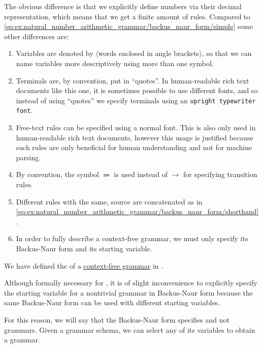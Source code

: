 \begin{example}
  The obvious difference is that we explicitly define numbers via their decimal representation, which means that we get a finite amount of rules. Compared to \eqref{eq:ex:natural_number_arithmetic_grammar/backus_naur_form/simple} some other differences are:
  \begin{enumerate}
    \item Variables are denoted by \( \langle \)words enclosed in angle brackets\( \rangle \), so that we can name variables more descriptively using more than one symbol.
    \item Terminals are, by convention, put in \enquote{quotes}. In human-readable rich text documents like this one, it is sometimes possible to use different fonts, and so instead of using \enquote{quotes} we specify terminals using an \texttt{upright typewriter font}.
    \item Free-text rules can be specified using a normal font. This is also only used in human-readable rich text documents, however this usage is justified because such rules are only beneficial for human understanding and not for machine parsing.
    \item By convention, the symbol \( \Coloneqq \) is used instead of \( \to \) for specifying transition rules.
    \item Different rules with the same, source are concatenated as in \eqref{eq:ex:natural_number_arithmetic_grammar/backus_naur_form/shorthand}.
    \item In order to fully describe a context-free grammar, we must only specify its Backus-Naur form and its starting variable.
  \end{enumerate}
\end{example}

\begin{definition}\label{def:backus_naur_form}
  We have defined the  of a \hyperref[def:grammar/context_free]{context-free grammar} in .

  Although formally necessary for , it is of slight inconvenience to explicitly specify the starting variable for a nontrivial grammar in Backus-Naur form because the same Backus-Naur form can be used with different starting variables.

  For this reason, we will say that the Backus-Naur form specifies  and not grammars. Given a grammar schema, we can select any of its variables to obtain a grammar.
\end{definition}

